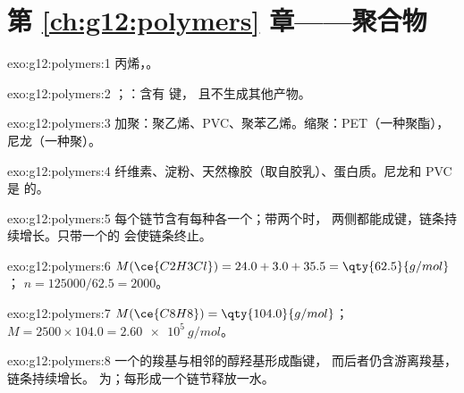 \section*{第 \ref{ch:g12:polymers} 章——聚合物}

\begin{solution}{exo:g12:polymers:1}
丙烯，。
\end{solution}

\begin{solution}{exo:g12:polymers:2}
；：含有  键，
且不生成其他产物。
\end{solution}

\begin{solution}{exo:g12:polymers:3}
加聚：聚乙烯、PVC、聚苯乙烯。缩聚：PET（一种聚酯），
尼龙（一种聚）。
\end{solution}

\begin{solution}{exo:g12:polymers:4}
纤维素、淀粉、天然橡胶（取自胶乳）、蛋白质。尼龙和 PVC 是
的。
\end{solution}

\begin{solution}{exo:g12:polymers:5}
每个链节含有每种各一个；带两个时，
两侧都能成键，链条持续增长。只带一个的
会使链条终止。
\end{solution}

\begin{solution}{exo:g12:polymers:6}
$M(\ce{C2H3Cl}) = 24.0 + 3.0 + 35.5 = \qty{62.5}{g/mol}$；
$n = 125000/62.5 = 2000$。
\end{solution}

\begin{solution}{exo:g12:polymers:7}
$M(\ce{C8H8}) = \qty{104.0}{g/mol}$；$M = 2500 \times 104.0 =
\qty{2.60e5}{g/mol}$。
\end{solution}

\begin{solution}{exo:g12:polymers:8}
一个的羧基与相邻的醇羟基形成酯键，
而后者仍含游离羧基，链条持续增长。
为；每形成一个链节释放一水。
\end{solution}

